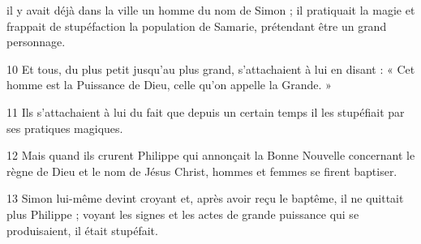 il y avait déjà dans la ville un homme du nom de Simon ; il pratiquait la magie et frappait de stupéfaction la population de Samarie, prétendant être un grand personnage.

10 Et tous, du plus petit jusqu’au plus grand, s’attachaient à lui en disant : « Cet homme est la Puissance de Dieu, celle qu’on appelle la Grande. »

11 Ils s’attachaient à lui du fait que depuis un certain temps il les stupéfiait par ses pratiques magiques.

12 Mais quand ils crurent Philippe qui annonçait la Bonne Nouvelle concernant le règne de Dieu et le nom de Jésus Christ, hommes et femmes se firent baptiser.

13 Simon lui-même devint croyant et, après avoir reçu le baptême, il ne quittait plus Philippe ; voyant les signes et les actes de grande puissance qui se produisaient, il était stupéfait.
